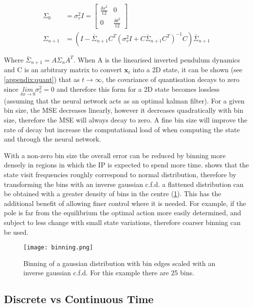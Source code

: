 \documentclass[../main.tex]{subfiles}
\begin{document}
\begin{align}
   \Sigma_0 &= \sigma_v^2 I = \begin{bmatrix} \frac{\delta x^2}{12} & 0 \\ 0 & \frac{\delta \theta^2}{12} \end{bmatrix}\label{equ:errora}\\
      \Sigma_{n+1} &= (I - \bar{\Sigma}_{n+1}C^T (\sigma_v^2 I + C \bar{\Sigma}_{n+1} C^T)^{-1} C)\bar{\Sigma}_{n+1} \label{equ:errorb}
\end{align}

Where $\bar{\Sigma}_{n+1} = A \Sigma_n A^T$. When A is the linearised inverted pendulum dynamics and C is an arbitrary matrix to convert $\boldsymbol{x}_t$ into a 2D state, it can be shown (see \cref{appendix:quant}) that as $t \rightarrow \infty$, the covariance of quantisation decays to zero since $\underset{\delta x \rightarrow 0}{lim} \sigma_v^2 = 0$ and therefore this form for a 2D state becomes lossless (assuming that the neural network acts as an optimal kalman filter). For a given bin size, the MSE decreases linearly, however it decreases quadratically with bin size, therefore the MSE will always decay to zero. A fine bin size will improve the rate of decay but increase the computational load of when computing the state and through the neural network.

With a non-zero bin size the overall error can be reduced by binning more densely in regions in which the IP is expected to spend more time.  shows that the state visit frequencies roughly correspond to normal distribution, therefore by transforming the bins with an inverse gaussian c.f.d. a flattened distribution can be obtained with a greater density of bins in the centre (\cref{fig:binning}). This has the additional benefit of allowing finer control where it is needed. For example, if the pole is far from the equilibrium the optimal action more easily determined, and subject to less change with small state variations, therefore coarser binning can be used.

\begin{figure}[h]
   \centering
   \texttt{[image: binning.png]}
   \caption{Binning of a gaussian distribution with bin edges scaled with an inverse gaussian c.f.d. For this example there are 25 bins.}
   \label{fig:binning}
\end{figure}

\subsection{Discrete vs Continuous Time}
\end{document}

